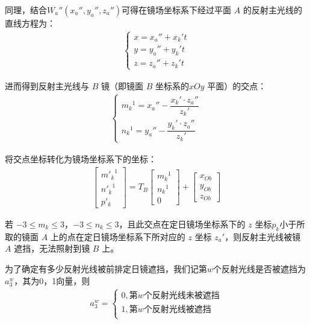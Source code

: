 \documentclass[../main.tex]{subfiles}
\begin{document}
\par 同理，结合$ W_a''(x_a'', y_a'', z_a'')$可得在镜场坐标系下经过平面 $A$ 的反射主光线的直线方程为：
\begin{align} \label{1.661}
 \begin{cases}
x = x_a'' + x_k' t \\
y = y_a'' + y_k' t \\
z = z_a'' + z_k' t
\end{cases}
\end{align}
\par 进而得到反射主光线与 $B$ 镜（即镜面 $B$ 坐标系的$xOy$ 平面）的交点：
\begin{align}\label{4.121}
  \begin{cases}
{m_k}^1 = x_a'' - \dfrac{x_k' \cdot z_a''}{z_k'} \\
{n_k}^1 = y_a'' - \dfrac{y_k' \cdot z_a''}{z_k'}
\end{cases}
\end{align}
\par 将交点坐标转化为镜场坐标系下的坐标：
\begin{align}\label{4.2}
\begin{bmatrix}
{m'_k}^1 \\
{n'_k}^1 \\
p'_k
\end{bmatrix}
= T_B \begin{bmatrix}
{m_k}^1  \\
{n_k}^1 \\
0
\end{bmatrix}
+ \begin{bmatrix}
x_{Ob} \\
y_{Ob} \\
z_{Ob}
\end{bmatrix}
\end{align}
\par 若 $-3 \leq m_k \leq 3$，$-3 \leq n_k \leq 3$，且此交点在定日镜场坐标系下的 $z$ 坐标$p_k$小于所取的镜面 $A$ 上的点在定日镜场坐标系下所对应的 $z$ 坐标 $z_a'$，则反射主光线被镜 \( A \) 遮挡，无法照射到镜 \( B \) 上。
\par 为了确定有多少反射光线被前排定日镜遮挡，我们记第$w$个反射光线是否被遮挡为$a_3^w$，其为0，1向量，则
\begin{align}    \label{1.33}
a_3^w = 
\begin{cases} 
0,\text{第}w\text{个反射光线未被遮挡}\\
1,\text{第}w\text{个反射光线被遮挡}\\
\end{cases}
 \end{align}
\end{document}
